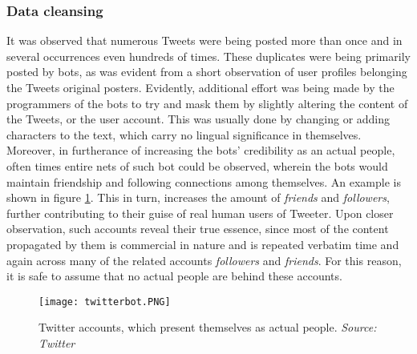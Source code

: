 		\subsubsection*{Data cleansing}
			It was observed that numerous Tweets were being posted more than once and in several occurrences even hundreds of times. These duplicates were being primarily posted by bots, as was evident from a short observation of user profiles belonging the Tweets original posters. Evidently, additional effort was being made by the programmers of the bots to try and mask them by slightly altering the content of the Tweets, or the user account. This was usually done by changing or adding characters to the text, which carry no lingual significance in themselves. Moreover, in furtherance of increasing the bots' credibility as an actual people, often times entire nets of such bot could be observed, wherein the bots would maintain friendship and following connections among themselves. An example is shown in figure \ref{fig:twitterbot}. This in turn, increases the amount of \textit{friends} and \textit{followers}, further contributing to their guise of real human users of Tweeter. Upon closer observation, such accounts reveal their true essence, since most of the content propagated by them is commercial in nature and is repeated verbatim time and again across many of the related accounts \textit{followers} and \textit{friends}. For this reason, it is safe to assume that no actual people are behind these accounts. 
		\par
		
		\begin{figure}[h]
			\centering
			\texttt{[image: twitterbot.PNG]}
			\captionsetup{width=0.8\textwidth}
			\caption[Fake Twitter Accounts]{Twitter accounts, which present themselves as actual people. \textit{Source: Twitter}}
			\label{fig:twitterbot}	
		\end{figure}
		
